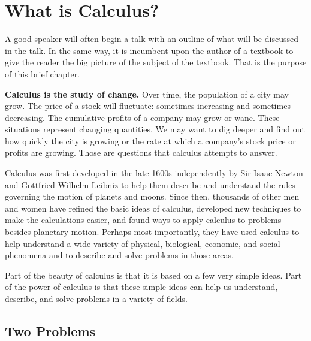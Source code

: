 \chapter{What is Calculus?}
\label{ch:whatiscalculus}


A good speaker will often begin a talk with an outline of what will be discussed in the talk. In the same way, it is incumbent upon the author of a textbook to give the reader the big picture of the subject of the textbook. That is the purpose of this brief chapter.

{\bf Calculus is the study of change.} Over time, the population of a city may grow. The price of a stock will fluctuate: sometimes increasing and sometimes decreasing. The cumulative profits of a company may grow or wane. These situations represent changing quantities. We may want to dig deeper and find out how quickly the city is growing or the rate at which a company's stock price or profits are growing. Those are questions that calculus attempts to answer.

Calculus was first developed in the late 1600s independently by Sir Isaac Newton and Gottfried Wilhelm Leibniz to help them describe and understand the rules governing the motion of planets and moons. Since then, thousands of other men and women have refined the basic ideas of calculus, developed new techniques to make the calculations easier, and found ways to apply calculus to problems besides planetary motion. Perhaps most importantly, they have used calculus to help understand a wide variety of physical, biological, economic, and social phenomena and to describe and solve problems in those areas.

Part of the beauty of calculus is that it is based on a few very simple ideas. Part of the power of calculus is that these simple ideas can help us understand, describe, and solve problems in a variety of fields.

\section{Two Problems}
\label{sec:twoproblems}

